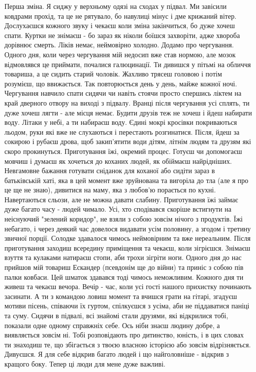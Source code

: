 Перша зміна. Я сиджу у верхньому одязі на сходах у підвал. Ми завісили ковдрами прохід, та це не рятувало, бо навулиці мінус і дме крижаний вітер. Дослухаєшся кожного звуку і чекаєш коли зміна закінчиться, бо дуже хочеш спати. Куртки не знімаєш - бо зараз як ніколи боїшся захворіти, адже хвороба дорівнює смерть. Ліків немає, неймовірно холодно. 
Додамо про чергування. 
Одного дня, коли через чергування мій недосип вже став нормою, але мозок відмовлявся це приймати, почалися галюцинації. Ти дивишся у пітьмі на обличчя товариша, а це сидить старий чоловік. Жахливо трясеш головою і потім розумієш, що ввижається. Так повторюється день у день, майже кожної ночі. Чергування навчило спати сидячи чи навіть стоячи просто спершись ліктем на край дверного отвору на виході з підвалу. 
Вранці після чергування усі сплять, ти дуже хочеш лягти - але місця немає. Будити друзів теж не хочеш і йдеш набирати воду. Літаки у небі, а ти набираєш воду. Єдині мокрі кросівки покриваються льодом, руки які вже не слухаються і перестають розгинатися. Після, йдеш за сокирою і рубаєш дрова, щоб закип'ятити води дітям, літнім людям та друзям які скоро прокинуться. 
Приготування їжі, окремий процес.
  Готуєш чи допомогаєш мовчиш і думаєш як хочеться до коханих людей, як обіймаєш найрідніших. Невгамовне бажання готувати сніданок для коханої або сидіти зараз в батьківській хаті, яка в цей момент вже зруйнована та вигоріла до тла (але я про це ще не знаю), дивитися на маму, яка з любов'ю порається по кухні. Навертаються сльози, але не можна давати слабину.
Приготування їжі займає дуже багато часу - людей чимало. Усі, хто сподівався скоріше встигнути на неіснуючий "зелений коридор", не взяли з собою зовсім нічого з продуктів. Їжі небагато, і через деякий час довелося видавати усім половину, а згодом і третину звичної порції. Солодке здавалося чимось неймовірним та вже нереальним. Після приготування заходиш всередину приміщення та чекаєш, коли зігрієшся. Знімаєш взуття та кулаками натираєш стопи, аби трохи зігріти ноги. 
Одного дня до нас прийшов мій товариш Ескандер (псевдонім ще до війни) та приніс з собою пів палки ковбаси. Цей шматок здавався тоді чимось неможливим.
Кожного дня ти живеш та чекаєш вечора. Вечір - час, коли усі гості нашого прихистку починають засинати. А ти з командою ловиш момент та вчишся грати на гітарі, згадуєш мотиви пісень, співаючи їх гуртом, спілкуєшся з усіма, аби не піддаватися паніці та суму. 
Сидячи в підвалі, всі знайомі стали друзями, які відкрилися тобі, показали одне одному справжніх себе. Ось ніби знаєш людину добре, а виявляється зовсім ні. Тобі розповідають про дитинство, юність, і в цих словах ти знаходиш те, що збігається з твоєю власною історією або зовсім відрізняється. Дивуєшся. Я для себе відкрив багато людей і що найголовніше - відкрив з кращого боку. Тепер ці люди для мене дуже важливі. 

